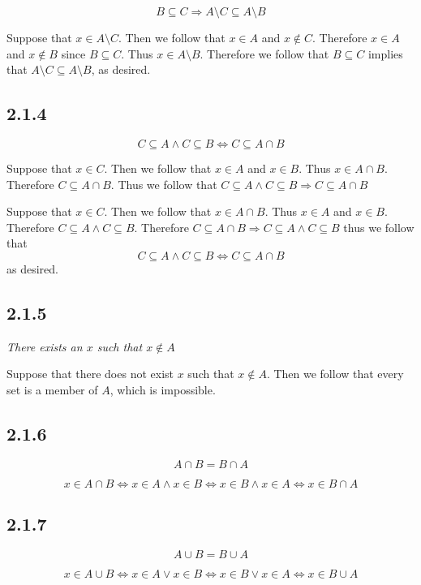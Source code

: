 \documentclass[11pt,oneside,titlepage]{book}
\DeclareMathOperator \imp {\Rightarrow}
\begin{document}
$$B \subseteq C \imp A \setminus C \subseteq A \setminus B$$

Suppose that $x \in A \setminus C$. Then we follow that $x \in A$ and $x \notin C$. Therefore
$x \in A$ and $x \notin B$ since $B \subseteq C$. Thus $x \in A \setminus B$. Therefore
we follow that $B \subseteq C$ implies that  $A \setminus C \subseteq A \setminus B$,
as desired.

\subsection*{2.1.4}

$$C \subseteq A \land C \subseteq B \iff C \subseteq A \cap B$$

Suppose that $x \in C$. Then we follow that $x \in A$ and $x \in B$. Thus $x \in A \cap B$.
Therefore $C \subseteq A \cap B$. Thus we follow that
$C \subseteq A \land C \subseteq B \imp C \subseteq A \cap B$

Suppose that $x \in C$. Then we follow that $x \in A \cap B$. Thus $x \in A$ and $x \in B$.
Therefore $C \subseteq A \land C \subseteq B$. Therefore
$C \subseteq A \cap B \imp C \subseteq A \land C \subseteq B $
thus we follow that
$$C \subseteq A \land C \subseteq B \iff C \subseteq A \cap B$$
as desired.

\subsection*{2.1.5}

\textit{There exists an $x$ such that $x \notin A$}

Suppose that there does not exist $x$ such that $x \notin A$. Then we follow that every set is a
member of $A$, which is impossible.

\subsection*{2.1.6}

$$A \cap B = B \cap A$$

$$x \in A \cap B \iff x \in A \land x \in B \iff x \in B \land x \in A \iff x \in B \cap A$$

\subsection*{2.1.7}

$$A \cup B = B \cup A$$

$$x \in A \cup B \iff x \in A \lor x \in B \iff x \in B \lor x \in A \iff x \in B \cup A$$
\end{document}
